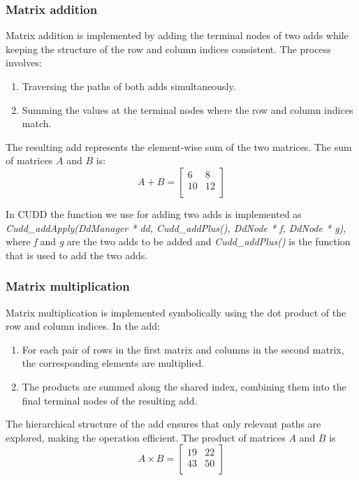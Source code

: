 \subsubsection{Matrix addition}
Matrix addition is implemented by adding the terminal nodes of two \glspl{add} while keeping the structure of the row and column indices consistent. The process involves:
\begin{enumerate}
    \item Traversing the paths of both \glspl{add} simultaneously.
    \item Summing the values at the terminal nodes where the row and column indices match.
\end{enumerate}
The resulting \gls{add} represents the element-wise sum of the two matrices.
The sum of matrices $A$ and $B$ is:
\[
    A + B = \begin{bmatrix}
        6  & 8  \\
        10 & 12 \\
    \end{bmatrix}
\]

In CUDD the function we use for adding two \glspl{add} is implemented as \textit{Cudd\_addApply(DdManager * dd, Cudd\_addPlus(), DdNode * f, DdNode * g)}, where \textit{f} and \textit{g} are the two \glspl{add} to be added and \textit{Cudd\_addPlus()} is the function that is used to add the two \glspl{add}.

\subsubsection{Matrix multiplication}
Matrix multiplication is implemented symbolically using the dot product of the row and column indices. In the \gls{add}:
\begin{enumerate}
    \item For each pair of rows in the first matrix and columns in the second matrix, the corresponding elements are multiplied.
    \item The products are summed along the shared index, combining them into the final terminal nodes of the resulting \gls{add}.
\end{enumerate}
The hierarchical structure of the \gls{add} ensures that only relevant paths are explored, making the operation efficient.
The product of matrices $A$ and $B$ is
\[
    A \times B = \begin{bmatrix}
        19 & 22 \\
        43 & 50 \\
    \end{bmatrix}
\]

